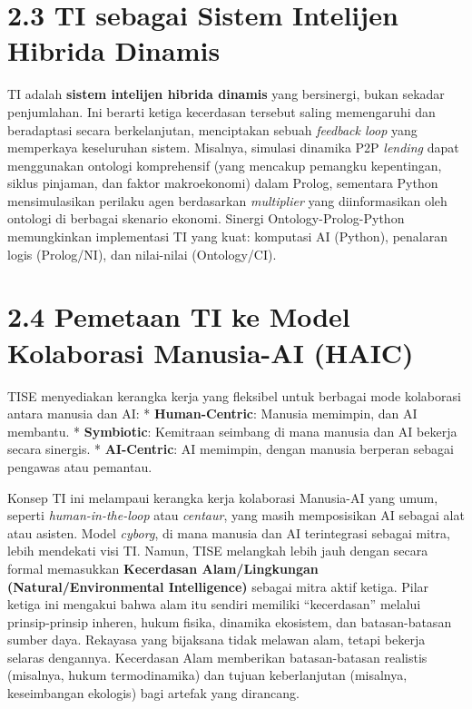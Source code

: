 \documentclass[
  letterpaper,
  DIV=11,
  numbers=noendperiod]{scrreprt}
\begin{document}
\section{\texorpdfstring{\textbf{2.3 TI sebagai Sistem Intelijen Hibrida
Dinamis}}{2.3 TI sebagai Sistem Intelijen Hibrida Dinamis}}\label{ti-sebagai-sistem-intelijen-hibrida-dinamis}

TI adalah \textbf{sistem intelijen hibrida dinamis} yang bersinergi,
bukan sekadar penjumlahan. Ini berarti ketiga kecerdasan tersebut saling
memengaruhi dan beradaptasi secara berkelanjutan, menciptakan sebuah
\emph{feedback loop} yang memperkaya keseluruhan sistem. Misalnya,
simulasi dinamika P2P \emph{lending} dapat menggunakan ontologi
komprehensif (yang mencakup pemangku kepentingan, siklus pinjaman, dan
faktor makroekonomi) dalam Prolog, sementara Python mensimulasikan
perilaku agen berdasarkan \emph{multiplier} yang diinformasikan oleh
ontologi di berbagai skenario ekonomi. Sinergi Ontology-Prolog-Python
memungkinkan implementasi TI yang kuat: komputasi AI (Python), penalaran
logis (Prolog/NI), dan nilai-nilai (Ontology/CI).

\section{\texorpdfstring{\textbf{2.4 Pemetaan TI ke Model Kolaborasi
Manusia-AI
(HAIC)}}{2.4 Pemetaan TI ke Model Kolaborasi Manusia-AI (HAIC)}}\label{pemetaan-ti-ke-model-kolaborasi-manusia-ai-haic}

TISE menyediakan kerangka kerja yang fleksibel untuk berbagai mode
kolaborasi antara manusia dan AI: * \textbf{Human-Centric}: Manusia
memimpin, dan AI membantu. * \textbf{Symbiotic}: Kemitraan seimbang di
mana manusia dan AI bekerja secara sinergis. * \textbf{AI-Centric}: AI
memimpin, dengan manusia berperan sebagai pengawas atau pemantau.

Konsep TI ini melampaui kerangka kerja kolaborasi Manusia-AI yang umum,
seperti \emph{human-in-the-loop} atau \emph{centaur}, yang masih
memposisikan AI sebagai alat atau asisten. Model \emph{cyborg}, di mana
manusia dan AI terintegrasi sebagai mitra, lebih mendekati visi TI.
Namun, TISE melangkah lebih jauh dengan secara formal memasukkan
\textbf{Kecerdasan Alam/Lingkungan (Natural/Environmental Intelligence)}
sebagai mitra aktif ketiga. Pilar ketiga ini mengakui bahwa alam itu
sendiri memiliki ``kecerdasan'' melalui prinsip-prinsip inheren, hukum
fisika, dinamika ekosistem, dan batasan-batasan sumber daya. Rekayasa
yang bijaksana tidak melawan alam, tetapi bekerja selaras dengannya.
Kecerdasan Alam memberikan batasan-batasan realistis (misalnya, hukum
termodinamika) dan tujuan keberlanjutan (misalnya, keseimbangan
ekologis) bagi artefak yang dirancang.
\end{document}
